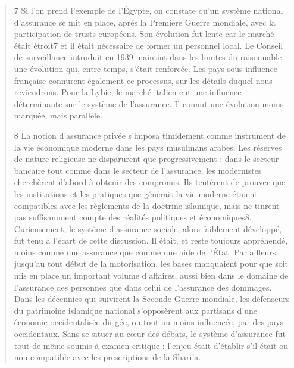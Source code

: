 \begin{quote}
7 Si l’on prend l’exemple de l’Égypte, on constate qu’un système national d’assurance se mit en place, après la Première Guerre mondiale, avec la participation de trusts européens. Son évolution fut lente car le marché était étroit7 et il était nécessaire de former un personnel local. Le Conseil de surveillance introduit en 1939 maintint dans les limites du raisonnable une évolution qui, entre temps, s’était renforcée. Les pays sous influence française connurent également ce processus, sur les détails duquel nous reviendrons. Pour la Lybie, le marché italien eut une influence déterminante sur le système de l’assurance. Il connut une évolution moins marquée, mais parallèle.

 
8 La notion d’assurance privée s’imposa timidement comme instrument de la vie économique moderne dans les pays musulmans arabes. Les réserves de nature religieuse ne disparurent que progressivement : dans le secteur bancaire tout comme dans le secteur de l’assurance, les modernistes cherchèrent d’abord à obtenir des compromis. Ils tentèrent de prouver que les institutions et les pratiques que générait la vie moderne étaient compatibles avec les règlements de la doctrine islamique, mais ne tinrent pas suffisamment compte des réalités politiques et économiques8. Curieusement, le système d’assurance sociale, alors faiblement développé, fut tenu à l’écart de cette discussion. Il était, et reste toujours appréhendé, moins comme une assurance que comme une aide de l’État. Par ailleurs, jusqu’au tout début de la motorisation, les bases manquaient pour que soit mis en place un important volume d’affaires, aussi bien dans le domaine de l’assurance des personnes que dans celui de l’assurance des dommages. Dans les décennies qui suivirent la Seconde Guerre mondiale, les défenseurs du patrimoine islamique national s’opposèrent aux partisans d’une économie occidentalisée dirigée, ou tout au moins influencée, par des pays occidentaux. Sans se situer au cœur des débats, le système d’assurance fut tout de même soumis à examen critique : l’enjeu était d’établir s’il était ou non compatible avec les prescriptions de la Shari’a.
 

\end{quote}
